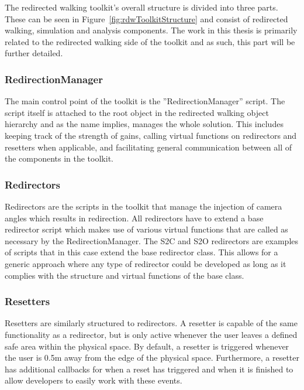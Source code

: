 The redirected walking toolkit's overall structure is divided into three parts. These can be seen in Figure~\ref{fig:rdwToolkitStructure} and consist of redirected walking, simulation and analysis components. The work in this thesis is primarily related to the redirected walking side of the toolkit and as such, this part will be further detailed. 

\subsubsection{RedirectionManager}
The main control point of the toolkit is the ''RedirectionManager'' script. The script itself is attached to the root object in the redirected walking object hierarchy and as the name implies, manages the whole solution. This includes keeping track of the strength of gains, calling virtual functions on redirectors and resetters when applicable, and facilitating general communication between all of the components in the toolkit. 

\subsubsection{Redirectors}
Redirectors are the scripts in the toolkit that manage the injection of camera angles which results in redirection. All redirectors have to extend a base redirector script which makes use of various virtual functions that are called as necessary by the RedirectionManager. The S2C and S2O redirectors are examples of scripts that in this case extend the base redirector class. This allows for a generic approach where any type of redirector could be developed as long as it complies with the structure and virtual functions of the base class. 

\subsubsection{Resetters}
Resetters are similarly structured to redirectors. A resetter is capable of the same functionality as a redirector, but is only active whenever the user leaves a defined safe area within the physical space. By default, a resetter is triggered whenever the user is 0.5m away from the edge of the physical space. Furthermore, a resetter has additional callbacks for when a reset has triggered and when it is finished to allow developers to easily work with these events. 
